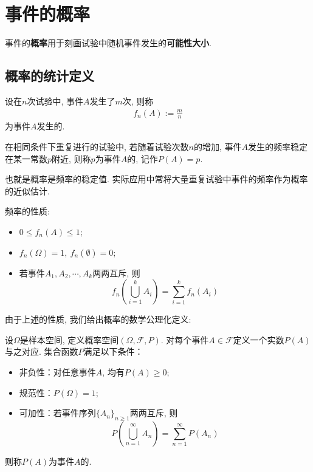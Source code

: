 \section{事件的概率}

事件的\textbf{概率}用于刻画试验中随机事件发生的\textbf{可能性大小}.

\subsection{概率的统计定义}
\label{sec:prob-stat-defn}
\begin{definition*}
    设在$n$次试验中, 事件$A$发生了$m$次, 则称
    \begin{align*}
        f_n(A):=\frac{m}{n}
    \end{align*}
    为事件$A$发生的.
\end{definition*}

\begin{definition*}%
    在相同条件下重复进行的试验中, 若随着试验次数$n$的增加, 
    事件$A$发生的频率稳定在某一常数$p$附近, 
    则称$p$为事件$A$的, 记作$P(A)=p$.
\end{definition*}
也就是概率是频率的稳定值. 实际应用中常将大量重复试验中事件的频率作为概率的近似估计.

\begin{proposition*}
    频率的性质:
    \begin{itemize}
        \item $0\le f_n(A)\le 1$;
        \item $f_n(\Omega)=1,\ f_n(\emptyset)=0$;
        \item 若事件$A_1, A_2, \cdots, A_k$两两互斥, 则
              $$f_n \left( \bigcup_{i=1}^k A_i \right)=\sum_{i=1}^k f_n(A_i)$$
    \end{itemize}
\end{proposition*}

由于上述的性质, 我们给出概率的数学公理化定义:
\begin{definition}[概率的公理化定义]
    \label{def:prob}
    设$\Omega$是样本空间, 定义概率空间$(\Omega,\mathcal{F},P)$. 对每个事件$A\in \mathcal{F}$定义一个实数$P(A)$与之对应. 
    集合函数$P$满足以下条件：
    \begin{itemize}
        \item 非负性：对任意事件$A$, 均有$P(A)\ge 0$;
        \item 规范性：$P(\Omega)=1$;
        \item 可加性：若事件序列$\{A_n\}_{n\ge 1}$两两互斥, 则
              $$P \left( \bigcup_{n=1}^{\infty} A_n \right)=\sum_{n=1}^{\infty} P(A_n)$$
    \end{itemize}
    则称$P(A)$为事件$A$的.
\end{definition}


